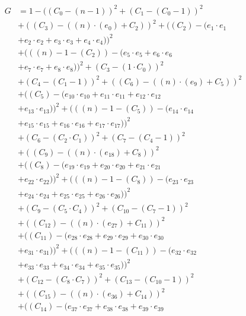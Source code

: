 \documentclass[10pt, a4paper]{article}
\begin{document}
\begin{small}
\begin{align*}
G &= 1 - ((C_{0} - (n - 1))^{2} + (C_{1} - (C_{0} - 1))^{2} \\
& + ((C_{3}) - ((n)  \cdot  (e_{0}) + C_{2}))^{2} + ((C_{2}) - (e_{1} \cdot e_{1} \\
& + e_{2} \cdot e_{2} + e_{3} \cdot e_{3} + e_{4} \cdot e_{4}))^{2} \\
& + (((n) - 1 - (C_{2})) - (e_{5} \cdot e_{5} + e_{6} \cdot e_{6} \\
& + e_{7} \cdot e_{7} + e_{8} \cdot e_{8}))^{2} + (C_{3} - (1  \cdot  C_{0}))^{2} \\
& + (C_{4} - (C_{1} - 1))^{2} + ((C_{6}) - ((n)  \cdot  (e_{9}) + C_{5}))^{2} \\
& + ((C_{5}) - (e_{10} \cdot e_{10} + e_{11} \cdot e_{11} + e_{12} \cdot e_{12} \\
& + e_{13} \cdot e_{13}))^{2} + (((n) - 1 - (C_{5})) - (e_{14} \cdot e_{14} \\
& + e_{15} \cdot e_{15} + e_{16} \cdot e_{16} + e_{17} \cdot e_{17}))^{2} \\
& + (C_{6} - (C_{2}  \cdot  C_{1}))^{2} + (C_{7} - (C_{4} - 1))^{2} \\
& + ((C_{9}) - ((n)  \cdot  (e_{18}) + C_{8}))^{2} \\
& + ((C_{8}) - (e_{19} \cdot e_{19} + e_{20} \cdot e_{20} + e_{21} \cdot e_{21} \\
& + e_{22} \cdot e_{22}))^{2} + (((n) - 1 - (C_{8})) - (e_{23} \cdot e_{23} \\
& + e_{24} \cdot e_{24} + e_{25} \cdot e_{25} + e_{26} \cdot e_{26}))^{2} \\
& + (C_{9} - (C_{5}  \cdot  C_{4}))^{2} + (C_{10} - (C_{7} - 1))^{2} \\
& + ((C_{12}) - ((n)  \cdot  (e_{27}) + C_{11}))^{2} \\
& + ((C_{11}) - (e_{28} \cdot e_{28} + e_{29} \cdot e_{29} + e_{30} \cdot e_{30} \\
& + e_{31} \cdot e_{31}))^{2} + (((n) - 1 - (C_{11})) - (e_{32} \cdot e_{32} \\
& + e_{33} \cdot e_{33} + e_{34} \cdot e_{34} + e_{35} \cdot e_{35}))^{2} \\
& + (C_{12} - (C_{8}  \cdot  C_{7}))^{2} + (C_{13} - (C_{10} - 1))^{2} \\
& + ((C_{15}) - ((n)  \cdot  (e_{36}) + C_{14}))^{2} \\
& + ((C_{14}) - (e_{37} \cdot e_{37} + e_{38} \cdot e_{38} + e_{39} \cdot e_{39} \\

\end{align*}
\end{small}
\end{document}

